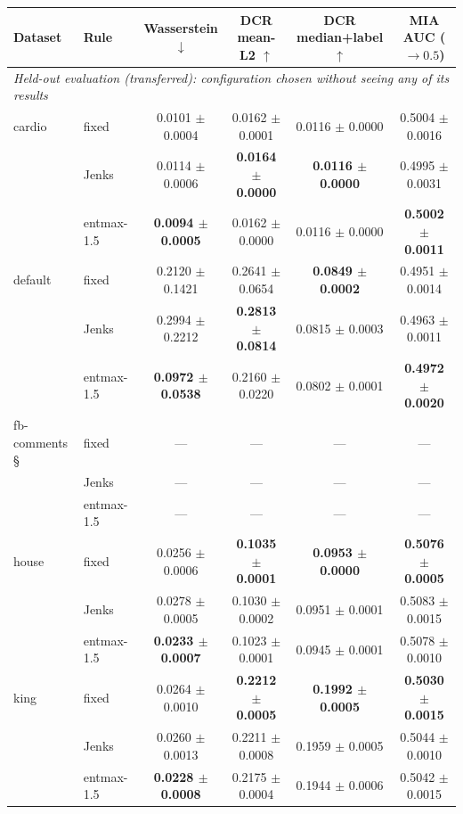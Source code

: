 \begin{table}[t]
\centering\small
\begin{tabular}{llcccc}
\toprule
Dataset & Rule & Wasserstein $\downarrow$ & DCR mean-L2 $\uparrow$ & DCR median+label $\uparrow$ & MIA AUC ($\to 0.5$) \\
\midrule
\multicolumn{6}{l}{\textit{Held-out evaluation (transferred): configuration chosen without seeing any of its results}} \\
cardio & fixed & 0.0101 $\pm$ 0.0004 & 0.0162 $\pm$ 0.0001 & 0.0116 $\pm$ 0.0000 & 0.5004 $\pm$ 0.0016 \\
 & Jenks & 0.0114 $\pm$ 0.0006 & \textbf{0.0164 $\pm$ 0.0000} & \textbf{0.0116 $\pm$ 0.0000} & 0.4995 $\pm$ 0.0031 \\
 & entmax-1.5 & \textbf{0.0094 $\pm$ 0.0005} & 0.0162 $\pm$ 0.0000 & 0.0116 $\pm$ 0.0000 & \textbf{0.5002 $\pm$ 0.0011} \\
\addlinespace
default & fixed & 0.2120 $\pm$ 0.1421 & 0.2641 $\pm$ 0.0654 & \textbf{0.0849 $\pm$ 0.0002} & 0.4951 $\pm$ 0.0014 \\
 & Jenks & 0.2994 $\pm$ 0.2212 & \textbf{0.2813 $\pm$ 0.0814} & 0.0815 $\pm$ 0.0003 & 0.4963 $\pm$ 0.0011 \\
 & entmax-1.5 & \textbf{0.0972 $\pm$ 0.0538} & 0.2160 $\pm$ 0.0220 & 0.0802 $\pm$ 0.0001 & \textbf{0.4972 $\pm$ 0.0020} \\
\addlinespace
fb-comments § & fixed & --- & --- & --- & --- \\
 & Jenks & --- & --- & --- & --- \\
 & entmax-1.5 & --- & --- & --- & --- \\
\addlinespace
house & fixed & 0.0256 $\pm$ 0.0006 & \textbf{0.1035 $\pm$ 0.0001} & \textbf{0.0953 $\pm$ 0.0000} & \textbf{0.5076 $\pm$ 0.0005} \\
 & Jenks & 0.0278 $\pm$ 0.0005 & 0.1030 $\pm$ 0.0002 & 0.0951 $\pm$ 0.0001 & 0.5083 $\pm$ 0.0015 \\
 & entmax-1.5 & \textbf{0.0233 $\pm$ 0.0007} & 0.1023 $\pm$ 0.0001 & 0.0945 $\pm$ 0.0001 & 0.5078 $\pm$ 0.0010 \\
\addlinespace
king & fixed & 0.0264 $\pm$ 0.0010 & \textbf{0.2212 $\pm$ 0.0005} & \textbf{0.1992 $\pm$ 0.0005} & \textbf{0.5030 $\pm$ 0.0015} \\
 & Jenks & 0.0260 $\pm$ 0.0013 & 0.2211 $\pm$ 0.0008 & 0.1959 $\pm$ 0.0005 & 0.5044 $\pm$ 0.0010 \\
 & entmax-1.5 & \textbf{0.0228 $\pm$ 0.0008} & 0.2175 $\pm$ 0.0004 & 0.1944 $\pm$ 0.0006 & 0.5042 $\pm$ 0.0015 \\

\end{tabular}
\end{table}
